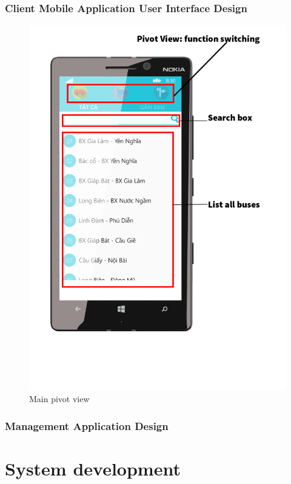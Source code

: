 	\subsubsection{Client Mobile Application User Interface Design}
		\begin{figure}[H]
			\centering
			\includegraphics[scale=0.4]{Chapters/Fig/MainPivotView_inPhone.png}
			\caption{Main pivot view}
			\label{fig:architecture-of-webservice}
		\end{figure}
	\subsubsection{Management Application Design}


\section{System development}
